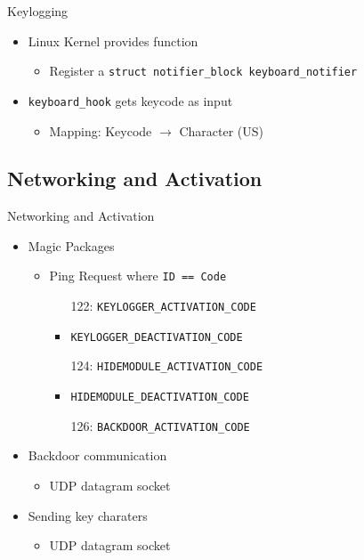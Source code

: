 \documentclass[]{beamer}
\begin{document}
\begin{frame}[t]{Keylogging}
  \begin{itemize}
    \item Linux Kernel provides function
    \begin{itemize}
      \item Register a \lstinline{struct notifier_block keyboard_notifier}
    \end{itemize}
    \item \lstinline{keyboard_hook} gets keycode as input
    \begin{itemize}
      \item Mapping: Keycode $\rightarrow$ Character (US)
    \end{itemize}
  \end{itemize}
  
\end{frame}



\subsection{Networking and Activation}

\begin{frame}[t]{Networking and Activation}
  \begin{itemize}
    \item Magic Packages
    \begin{itemize}
      \item Ping Request where \lstinline{ID == Code}
      \begin{itemize}
        \item[122:] \lstinline{KEYLOGGER_ACTIVATION_CODE}
        \item[123:] \lstinline{KEYLOGGER_DEACTIVATION_CODE}
        \item[124:] \lstinline{HIDEMODULE_ACTIVATION_CODE}
        \item[125:] \lstinline{HIDEMODULE_DEACTIVATION_CODE}
        \item[126:] \lstinline{BACKDOOR_ACTIVATION_CODE}
      \end{itemize}
    \end{itemize}
    \item Backdoor communication
    \begin{itemize}
      \item UDP datagram socket
    \end{itemize}
    \item Sending key charaters
    \begin{itemize}
      \item UDP datagram socket
    \end{itemize}
  \end{itemize}
\end{frame}
\end{document}
